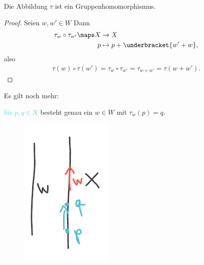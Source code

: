 \begin{lemma}
    Die Abbildung \( \tau \) ist ein Gruppenhomomorphismus.
\end{lemma}
\begin{proof}
    Seien \( w, w' \in W \)
    Dann
    \begin{align*}
        \tau_w\circ \tau_{w'}\maps \begin{aligned}[t] 
            X &\to X\\
            p &\mapsto p+\underbracket{w'+w},
        \end{aligned}
    \end{align*}
    also
    \begin{align*}
        \tau(w)\circ \tau(w')=\tau_w\circ \tau_{w'}=\tau_{w+w'}=\tau(w+w').
    \end{align*}
    
\end{proof}
Es gilt noch mehr:

\textcolor{Turquoise}{für \( p, q \in X \)} besteht genau ein \( w\in W \) mit \( \tau_w(p)=q \).

\begin{figure}[H]
    \centering
    \includegraphics[width=0.2\linewidth]{figures/tau_w_bijektion}
    \label{fig:tau_w_bijektion}
\end{figure}

